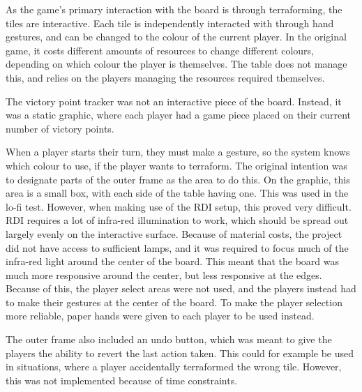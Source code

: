 As the game's primary interaction with the board is through terraforming, the tiles are interactive. Each tile is independently interacted with through hand gestures, and can be changed to the colour of the current player. In the original game, it costs different amounts of resources to change different colours, depending on which colour the player is themselves. The table does not manage this, and relies on the players managing the resources required themselves.

The victory point tracker was not an interactive piece of the board. Instead, it was a static graphic, where each player had a game piece placed on their current number of victory points.

When a player starts their turn, they must make a gesture, so the system knows which colour to use, if the player wants to terraform. The original intention was to designate parts of the outer frame as the area to do this. On the graphic, this area is a small box, with each side of the table having one. This was used in the lo-fi test. However, when making use of the RDI setup, this proved very difficult. RDI requires a lot of infra-red illumination to work, which should be spread out largely evenly on the interactive surface. Because of material costs, the project did not have access to sufficient lamps, and it was required to focus much of the infra-red light around the center of the board. This meant that the board was much more responsive around the center, but less responsive at the edges. Because of this, the player select areas were not used, and the players instead had to make their gestures at the center of the board. To make the player selection more reliable, paper hands were given to each player to be used instead. 

The outer frame also included an undo button, which was meant to give the players the ability to revert the last action taken. This could for example be used in situations, where a player accidentally terraformed the wrong tile. However, this was not implemented because of time constraints.